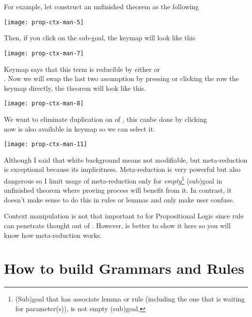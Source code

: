\documentclass[master.tex]{subfiles}
\begin{document}
For example, let construct an unfinished theorem as the following

\begin{center}
  \texttt{[image: prop-ctx-man-5]}
\end{center}

Then, if you click  on the sub-goal, the keymap will look
like this

\begin{center}
  \texttt{[image: prop-ctx-man-7]}
\end{center}

Keymap says that this term is reducible by either  or \\
. Now we will swap the last two assumption by
pressing  or clicking the row the keymap directly, the theorem will look
like this.

\begin{center}
  \texttt{[image: prop-ctx-man-8]}
\end{center}

We want to eliminate duplication on of , this canbe
done by clicking  \\ now  is also
available in keymap so we can select it.

\begin{center}
  \texttt{[image: prop-ctx-man-11]}
\end{center}

Although I said that white background means not modifiable, but meta-reduction
is exceptional because its implicitness. Meta-reduction is very powerful but
also dangerous so I limit usage of meta-reduction only for
\emph{empty}\footnote{(Sub)goal that has associate lemma or rule (including the
  one that is waiting for parameter(s)), is not empty (sub)goal.} (sub)goal in
unfinished theorem where proving process will benefit from it. In contrast, it
doesn't make sense to do this in rules or lemmas and only make user confuse.

Context manipulation is not that important to for Propositional Logic since rule
 can penetrate thought out of . However, is
better to show it here so you will know how meta-reduction works.

\section{How to build Grammars and Rules}
\label{sec:how_to_built_grammars_and_rules}
\end{document}
